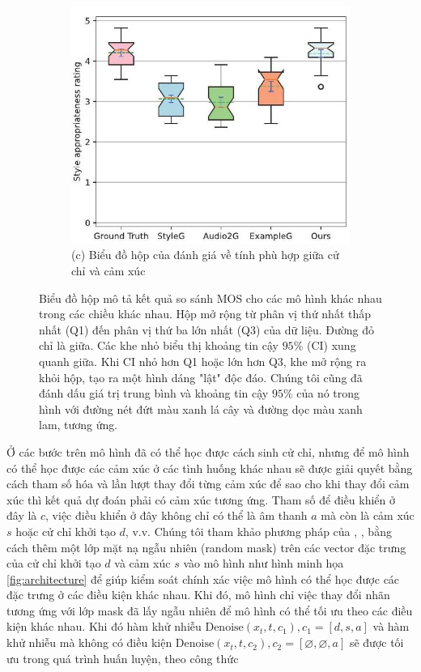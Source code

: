 \begin{figure}[htbp]
\begin{subfigure}[b]{0.3\textwidth}
    \end{subfigure}
    \hfill
    \begin{subfigure}[b]{0.3\textwidth}
        \includegraphics[width=\textwidth]{images/style_score.jpg}
        \caption*{(c) Biểu đồ hộp của đánh giá về tính phù hợp giữa cử chỉ và cảm xúc}
    \end{subfigure}
    \caption[Biểu đồ hộp mô tả kết quả so sánh MOS]{Biểu đồ hộp mô tả kết quả so sánh MOS cho các mô hình khác nhau trong các chiều khác nhau. Hộp mở rộng từ phân vị thứ nhất thấp nhất (Q1) đến phân vị thứ ba lớn nhất (Q3) của dữ liệu. Đường đỏ chỉ là giữa. Các khe nhỏ biểu thị khoảng tin cậy $95\%$ (CI) xung quanh giữa. Khi CI nhỏ hơn Q1 hoặc lớn hơn Q3, khe mở rộng ra khỏi hộp, tạo ra một hình dáng "lật" độc đáo. Chúng tôi cũng đã đánh dấu giá trị trung bình và khoảng tin cậy $95\%$ của nó trong hình với đường nét đứt màu xanh lá cây và đường dọc màu xanh lam, tương ứng.}
    \label{fig:3col}
\end{figure}


Ở các bước trên mô hình đã có thể học được cách sinh cử chỉ, nhưng để mô hình có thể học được các cảm xúc ở các tình huống khác nhau sẽ được giải quyết bằng cách tham số hóa và lần lượt thay đổi từng cảm xúc để sao cho khi thay đổi cảm xúc thì kết quả dự đoán phải có cảm xúc tương ứng.
Tham số để điều khiển ở đây là $c$, việc điều khiển ở đây không chỉ có thể là âm thanh $a$ mà còn là cảm xúc $s$ hoặc cử chỉ khởi tạo $d$, v.v. Chúng tôi tham khảo phương pháp của \cite{ho2022classifier}, \cite{tevet2022human}, bằng cách thêm một lớp mặt nạ ngẫu nhiên (random mask) trên các vector đặc trưng của cử chỉ khởi tạo $d$ và cảm xúc $s$ vào mô hình như hình minh họa \autoref{fig:architecture} để giúp kiểm soát chính xác việc mô hình có thể học được các đặc trưng ở các điều kiện khác nhau. Khi đó, mô hình chỉ việc thay đổi nhãn tương ứng với lớp mask đã lấy ngẫu nhiên để mô hình có thể tối ưu theo các điều kiện khác nhau. Khi đó hàm khử nhiễu $\text{Denoise} \left(x_{t}, t, c_{1}\right), c_{1}=[d, s, a]$ và hàm khử nhiễu mà không có điều kiện $\text{Denoise} \left(x_{t}, t, c_{2}\right), c_{2}=[\varnothing, \varnothing, a]$ sẽ được tối ưu trong quá trình huấn luyện, theo công thức

